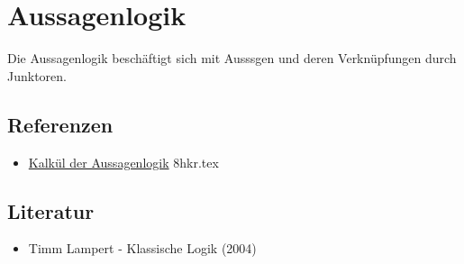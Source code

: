 \documentclass{sajzk}
\begin{document}
\section{Aussagenlogik} 
\label{olk9}

Die Aussagenlogik beschäftigt sich mit Ausssgen und deren Verknüpfungen durch Junktoren.

\subsection{Referenzen} 

\begin{itemize}
  \item \href{8hkr.pdf}{Kalkül der Aussagenlogik} 8hkr.tex
\end{itemize}

\subsection{Literatur} 

\begin{itemize}
  \item Timm Lampert - Klassische Logik (2004)
\end{itemize}
\end{document}
